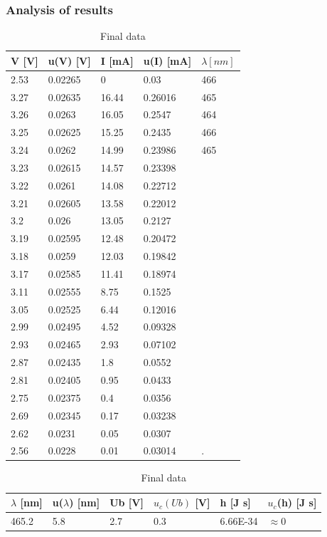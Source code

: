 \subsubsection*{Analysis of results}
\begin{table}[H]
    \centering
    \begin{tabular}{l|l|l|l|l}
        V [V]  & u(V) [V] & I [mA] & u(I) [mA] & $\lambda [nm]$ \\ \hline
        2.53 & 0.02265 & 0 & 0.03 & 466 \\ 
        3.27 & 0.02635 & 16.44 & 0.26016 & 465 \\ 
        3.26 & 0.0263 & 16.05 & 0.2547 & 464 \\ 
        3.25 & 0.02625 & 15.25 & 0.2435 & 466 \\ 
        3.24 & 0.0262 & 14.99 & 0.23986 & 465 \\ 
        3.23 & 0.02615 & 14.57 & 0.23398 &  \\ 
        3.22 & 0.0261 & 14.08 & 0.22712 & ~ \\ 
        3.21 & 0.02605 & 13.58 & 0.22012 & ~ \\ 
        3.2 & 0.026 & 13.05 & 0.2127 & ~ \\ 
        3.19 & 0.02595 & 12.48 & 0.20472 & ~ \\ 
        3.18 & 0.0259 & 12.03 & 0.19842 & ~ \\ 
        3.17 & 0.02585 & 11.41 & 0.18974 & ~ \\ 
        3.11 & 0.02555 & 8.75 & 0.1525 & ~ \\ 
        3.05 & 0.02525 & 6.44 & 0.12016 & ~ \\ 
        2.99 & 0.02495 & 4.52 & 0.09328 & ~ \\ 
        2.93 & 0.02465 & 2.93 & 0.07102 & ~ \\ 
        2.87 & 0.02435 & 1.8 & 0.0552 & ~ \\ 
        2.81 & 0.02405 & 0.95 & 0.0433 & ~ \\ 
        2.75 & 0.02375 & 0.4 & 0.0356 & ~ \\ 
        2.69 & 0.02345 & 0.17 & 0.03238 & ~ \\ 
        2.62 & 0.0231 & 0.05 & 0.0307 & ~ \\ 
        2.56 & 0.0228 & 0.01 & 0.03014 & . \\ 
    \end{tabular}
    \caption{Final data}
\end{table}

\begin{table}[H]
    \centering
    \begin{tabular}{l|l|l|l|l|l}
        $\lambda$ [nm] & u($\lambda$) [nm] & Ub [V] & $u_c(Ub)$ [V] & h [J s] & $u_c$(h) [J s] \\ \hline
        465.2 & 5.8 & 2.7 & 0.3 & 6.66E-34 & $\approx 0$ \\ 
    \end{tabular}
    \caption{Final data}
\end{table}

